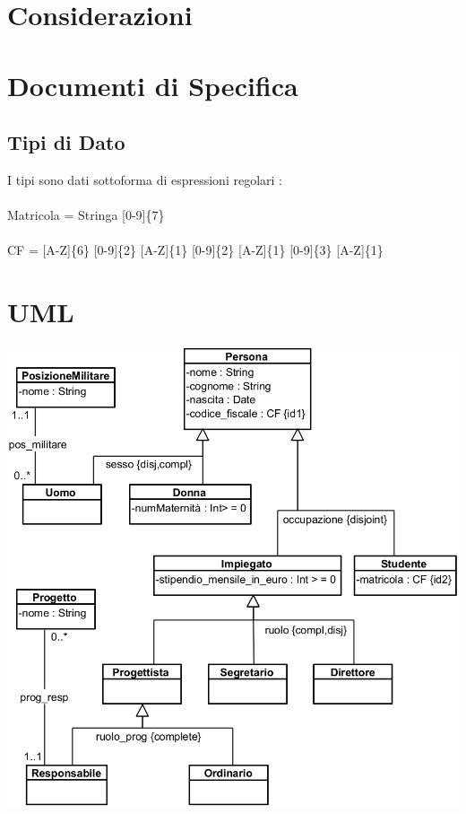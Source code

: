 \documentclass[12pt, letterpaper]{article}
\newcommand{\acc}{\\\hphantom{}\\}
\begin{document}
\section{Considerazioni}

\section{Documenti di Specifica}

\subsection{Tipi di Dato}
I tipi sono dati sottoforma di espressioni regolari : \acc
Matricola = Stringa [0-9]\{7\}\acc 
CF = [A-Z]\{6\} [0-9]\{2\} [A-Z]\{1\} [0-9]\{2\} [A-Z]\{1\} [0-9]\{3\} [A-Z]\{1\}

\section{UML}\begin{center}
    \includegraphics[width=\textwidth]{images/UML.png}
\end{center}
\end{document}

